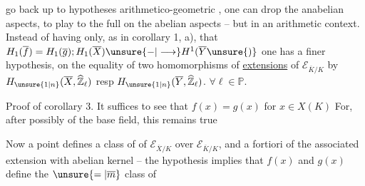 go back up to  hypotheses arithmetico-geometric , one can drop the anabelian aspects, to play to the full on the abelian aspects -- but in an arithmetic context. Instead of having  only, as in corollary 1, a),  that $H_1(\overline f)=H_1(\overline g);H_1(\overline X)\unsure{-|\longrightarrow}H^1(\overline Y\unsure{)}$ one has a finer hypothesis, on the equality of two homomorphisms of \uline{extensions} of $\mathcal E_{\overline K/K}$ by $H_{\unsure{1|n}}(\overline X,\widehat{\mathbb Z}_\ell)$ resp $H_{\unsure{1|n}}(\overline Y,\widehat{\mathbb Z}_\ell)$. $\forall\ell\in\mathbb P$.

Proof of corollary 3.
It suffices to see that $f(x)=g(x)$ for  $x\in X(K)$ For, after possibly   of the base field, this remains true   

Now a point defines a  class of   of $\mathcal E_{\overline X/K}$ over $\mathcal E_{\overline K/K}$, and a fortiori of the associated extension with abelian kernel -- the hypothesis implies that $f(x)$ and $g(x)$ define the $\unsure{=|\overline m}$ class of
